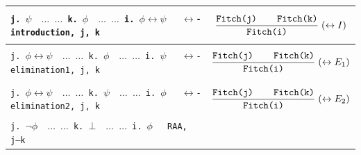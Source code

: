 \documentclass{article}
\begin{document}
\begin{center}
\begin{longtable}{|p{}|p{}|}
\texttt{j. $\psi \quad  \dots$
     \newline
     $\dots$
     \newline
     k. $ \phi \quad  \dots$
     \newline
     $\dots$
     \newline
     i. $\phi \leftrightarrow \psi \quad $ $\leftrightarrow$-introduction, j, k}

&

$$\displaystyle
\frac{\texttt{Fitch(j)\qquad Fitch(k)}}{\texttt{Fitch(i)}}\;(\leftrightarrow I)
$$

\\
\hline


\texttt{j. $\phi \leftrightarrow \psi \quad  \dots$
     \newline
     $\dots$
     \newline
     k. $ \phi \quad  \dots$
     \newline
     $\dots$
     \newline
     i. $\psi  \quad $ $\leftrightarrow$-elimination1, j, k}

&

$$\displaystyle
\frac{\texttt{Fitch(j)\qquad Fitch(k)}}{\texttt{Fitch(i)}}\;(\leftrightarrow E_1)
$$

\\
\hline






\texttt{j. $\phi \leftrightarrow \psi \quad  \dots$
     \newline
     $\dots$
     \newline
     k. $ \psi \quad  \dots$
     \newline
     $\dots$
     \newline
     i. $\phi  \quad $ $\leftrightarrow$-elimination2, j, k}

&

$$\displaystyle
\frac{\texttt{Fitch(j)\qquad Fitch(k)}}{\texttt{Fitch(i)}}\;(\leftrightarrow E_2)
$$

\\
\hline



\texttt{j. $\neg \phi \quad  \dots$
     \newline
     $\dots$
     \newline
     k. $ \bot \quad  \dots$
     \newline
     $\dots$
     \newline
     i. $\phi  \quad $ RAA, j–k}


\end{longtable}
\end{center}
\end{document}
